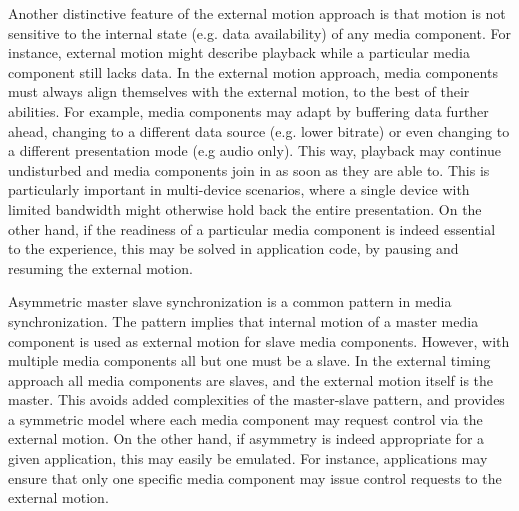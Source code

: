 
Another distinctive feature of the external motion approach is that motion is
not sensitive to the internal state (e.g. data availability) of any media
component. For instance, external motion might describe playback while a
particular media component still lacks data. In the external motion approach,
media components must always align themselves with the external motion, to the
best of their abilities. For example, media components may adapt by buffering
data further ahead, changing to a different data source (e.g. lower bitrate)
or even changing to a different presentation mode (e.g audio only). This way,
playback may continue undisturbed and media components join in as soon as they
are able to. This is particularly important in multi-device scenarios, where a
single device with limited bandwidth might otherwise hold back the entire
presentation. On the other hand, if the readiness of a particular media
component is indeed essential to the experience, this may be solved in
application code, by pausing and resuming the external motion.



Asymmetric master slave synchronization is a common pattern in media
synchronization. The pattern implies that internal motion of a master media
component is used as external motion for slave media components. However, with
multiple media components all but one must be a slave. In the external timing
approach all media components are slaves, and the external motion itself is
the master. This avoids added complexities of the master-slave  pattern, and
provides a symmetric model where each media component may request control via
the external motion. On the other hand, if asymmetry is indeed appropriate for
a given application, this may easily be emulated. For instance, applications
may ensure that only one specific media component may issue control requests
to the external motion.


